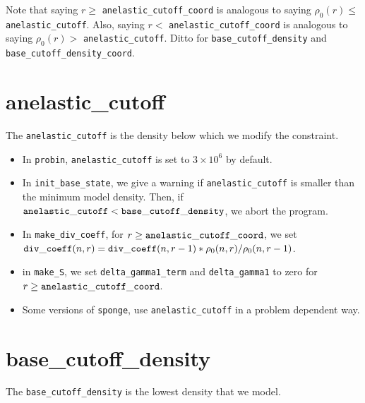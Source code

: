 Note that saying $r\ge$ {\tt anelastic\_cutoff\_coord} is analogous to saying $\rho_0(r)\le$ {\tt anelastic\_cutoff}.  Also, saying $r<$ {\tt anelastic\_cutoff\_coord} is analogous to saying $\rho_0(r)>$ {\tt anelastic\_cutoff}.  Ditto for {\tt base\_cutoff\_density} and {\tt base\_cutoff\_density\_coord}.

\section{anelastic\_cutoff}\label{Sec:Anelastic Cutoff}

The {\tt anelastic\_cutoff} is the density below which we modify the constraint.


\begin{itemize}

\item In {\tt probin}, {\tt anelastic\_cutoff} is set to $3\times 10^6$ by default.

\item In {\tt init\_base\_state}, we give a warning if {\tt anelastic\_cutoff}
  is smaller than the minimum model density.  Then, if ${\tt anelastic\_cutoff} 
  < {\tt base\_cutoff\_density}$, we abort the program.

\item In {\tt make\_div\_coeff}, for 
  $r \ge {\tt anelastic\_cutoff\_coord}$, we set
  ${\tt div\_coeff}(n,r) = {\tt div\_coeff}(n,r-1) * \rho_0(n,r)/\rho_0(n,r-1)$.

\item in {\tt make\_S}, we set {\tt delta\_gamma1\_term} and {\tt delta\_gamma1} 
  to zero for $r \ge {\tt anelastic\_cutoff\_coord}$.

\item Some versions of {\tt sponge}, use {\tt anelastic\_cutoff} in a problem dependent way.

\end{itemize}

\section{base\_cutoff\_density}\label{Sec:Base Cutoff Density}

The {\tt base\_cutoff\_density} is the lowest density that we model.

